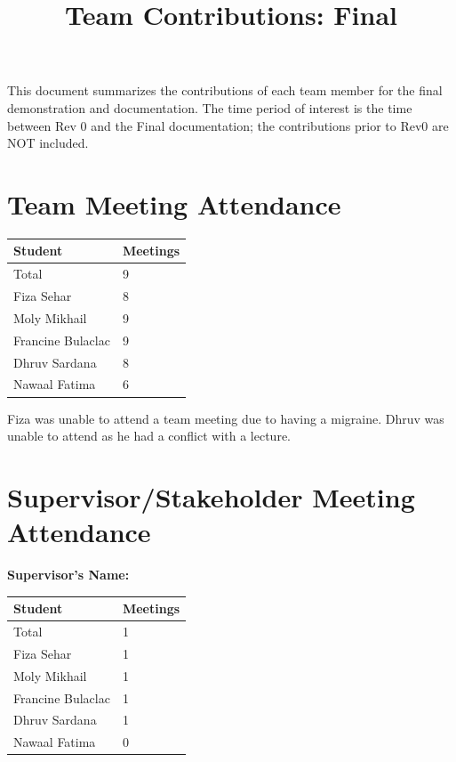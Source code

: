 \documentclass{article}
\title{Team Contributions: Final\\\progname}
\author{\authname}
\date{}
\begin{document}
\maketitle

This document summarizes the contributions of each team member for the final
demonstration and documentation.  The time period of interest is the time
between Rev 0 and the Final documentation; the contributions prior to Rev0 are
NOT included.

\section{Team Meeting Attendance}

\begin{table}[H]
\centering
\begin{tabular}{ll}
\toprule
\textbf{Student} & \textbf{Meetings}\\
\midrule
Total & 9\\
Fiza Sehar & 8\\
Moly Mikhail & 9\\
Francine Bulaclac & 9\\
Dhruv Sardana & 8\\
Nawaal Fatima & 6\\
\bottomrule
\end{tabular}
\end{table}

Fiza was unable to attend a team meeting due to having a migraine. Dhruv was unable to attend as he
had a conflict with a lecture. 

\section{Supervisor/Stakeholder Meeting Attendance}

\noindent \textbf{Supervisor's Name: } 

\begin{table}[H]
\centering
\begin{tabular}{ll}
\toprule
\textbf{Student} & \textbf{Meetings}\\
\midrule
Total & 1\\
Fiza Sehar & 1\\
Moly Mikhail & 1\\
Francine Bulaclac & 1\\
Dhruv Sardana & 1\\
Nawaal Fatima & 0\\
\bottomrule
\end{tabular}
\end{table}
\end{document}
